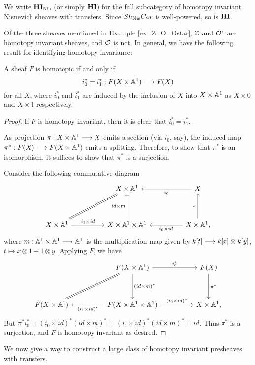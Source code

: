 We write $\mathbf{HI}_{\mathrm{Nis}}$ (or simply $\mathbf{HI}$) for the full subcategory 
of homotopy invariant Nisnevich sheaves with transfers. Since 
$Sh_{\mathrm{Nis}}Cor$ is well-powered, so is $\mathbf{HI}$.

Of the three sheaves mentioned in Example \ref{ex_Z_O_Ostar}, $\mathbb{Z}$
and $\mathcal{O}^*$ are homotopy invariant sheaves, and $\mathcal{O}$ is not. In 
general, we have the following result for identifying homotopy 
invariance:

\begin{lem}
A sheaf $F$ is homotopic if and only if
\[
i_0^* = i_1^* : F(X \times \mathbb{A}^1) \longrightarrow F(X)
\]
for all $X$, where $i_0^*$ and $i_1^*$ are induced by the 
inclusion of $X$ into $X \times \mathbb{A}^1$ as $X \times 0$ and $X 
\times 1$ respectively.
\end{lem}
\begin{proof}
If $F$ is homotopy invariant, then it is clear that $i_0^* = 
i_1^*$.

As projection $\pi: X \times \mathbb{A}^1 \longrightarrow X$ emits a section (via $i_0$, 
say), the induced map $\pi^*: F(X) \longrightarrow F(X \times \mathbb{A}^1)$ emits a
splitting. Therefore, to show that $\pi^*$ is an isomorphism, it
suffices to show that $\pi^*$ is a surjection.

Consider the following commutative diagram
\[
\begin{tikzcd}[row sep=huge, column sep=huge]
{}&
X \times \A^1&
X \arrow{l}{i_0}\\
X \times \A^1 \arrow[equals]{ru} \arrow{r}{i_1 \times id}&
X \times \A^1 \times \A^1 \arrow{u}{id \times m} &
X \times \A^1 \arrow{l}{i_0 \times id} \arrow{u}{\pi},
\end{tikzcd}
\]
where $m: \mathbb{A}^1 \times \mathbb{A}^1 \longrightarrow \mathbb{A}^1$ is the multiplication map
given by $k [t] \longrightarrow k [x] \otimes k 
[y]$, $t \mapsto x \otimes 1 + 1 \otimes y$. Applying $F$, we
have
\[
\begin{tikzcd}[row sep=huge, column sep=huge]
{}&
F(X \times \A^1) \arrow{r}{i_0^*}\arrow[equals]{ld}
   \arrow{d}{(id \times m)^*}&
F(X) \arrow{d}{\pi^*} \\
F(X \times \A^1)&
F(X \times \A^1 \times \A^1) \arrow{l}{(i_1 \times id)^*} 
   \arrow{r}{(i_0 \times id)^*}&
X \times \A^1,
\end{tikzcd}
\]
But $\pi^*i_0^* = (i_0 \times id)^*(id \times m)^* =
(i_1 \times id)^*(id \times m)^* = id$. Thus $\pi^*$ is a 
surjection, and $F$ is homotopy invariant as desired.
\end{proof}

We now give a way to construct a large class of homotopy invariant
presheaves with transfers.

